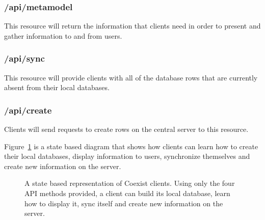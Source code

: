 \subsubsection{/api/metamodel}  \label{sec:api_metamodel}
This resource will return the information that clients need in order to present
and gather information to and from users.

\subsubsection{/api/sync}  \label{sec:api_sync}
This resource will provide clients with all of the database rows that are
currently absent from their local databases.

\subsubsection{/api/create}  \label{sec:api_create}
Clients will send requests to create rows on the central server to this
resource.

Figure~\ref{fig:client_states} is a state based diagram that shows how clients can
learn how to create their local databases, display information to users,
synchronize themselves and create new information on the server. 

\begin{figure}[h!]
\centering
{}
\caption{A state based representation of Coexist clients. Using only the four
API methods provided, a client can build its local database, learn how to
display it, sync itself and create new information on the server.}
\label{fig:client_states}
\end{figure}

